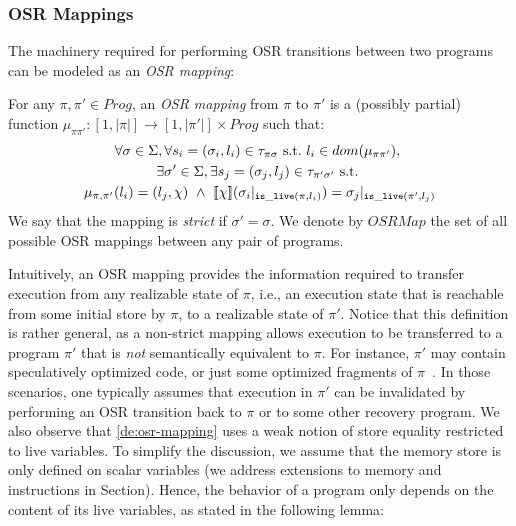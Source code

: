 \subsubsection{OSR Mappings}
\label{ss:osr-mapping}

The machinery required for performing OSR transitions between two programs can be modeled as an {\em OSR mapping}:

\begin{definition}
\label{de:osr-mapping}
For any $\pi,\pi'\in Prog$, an {\em OSR mapping} from $\pi$ to $\pi'$ is a (possibly partial) function
$\mu_{\pi\pi'}:[1,|\pi|]\rightarrow [1,|\pi'|]\times Prog$ such that:
\begin{gather*}
\forall \sigma\in\Sigma, \forall s_i=(\sigma_i,l_i)\in\tau_{\pi\sigma}~\text{s.t.}~l_i\in dom(\mu_{\pi\pi'}),~\\
\exists \sigma'\in\Sigma, \exists s_j=(\sigma_j,l_j)\in\tau_{\pi'\sigma'}~\text{s.t.}~\\
\mu_{\pi,\pi'}(l_i)=(l_j,\chi)~\wedge~[\![\chi]\!](\sigma_i\vert_{\text{${\tt is\_live}$}(\pi,l_i)})=\sigma_j\vert_{\text{${\tt is\_live}$}(\pi',l_j)}
\end{gather*}
We say that the mapping is {\em strict} if $\sigma'=\sigma$. We denote by $OSRMap$ the set of all possible OSR mappings between any pair of programs.
\end{definition}

\noindent Intuitively, an OSR mapping provides the information required to transfer execution from any realizable state of $\pi$, i.e., an execution state that is reachable from some initial store by $\pi$, to a realizable state of $\pi'$. Notice that this definition is rather general, as a non-strict mapping allows execution to be transferred to a program $\pi'$ that is {\em not} semantically equivalent to $\pi$. For instance, $\pi'$ may contain speculatively optimized code, or just some optimized fragments of $\pi$~\cite{Guo11, Bala00, Gal09}. In those scenarios, one typically assumes that execution in $\pi'$ can be invalidated by performing an OSR transition back to $\pi$ or to some other recovery program. We also observe that \mydefinition\ref{de:osr-mapping} uses a weak notion of store equality restricted to live variables. To simplify the discussion, we assume that the memory store is only defined on scalar variables (we address extensions to memory  and  instructions in Section\missing). Hence, the behavior of a program only depends on the content of its live variables, as stated in the following lemma:

